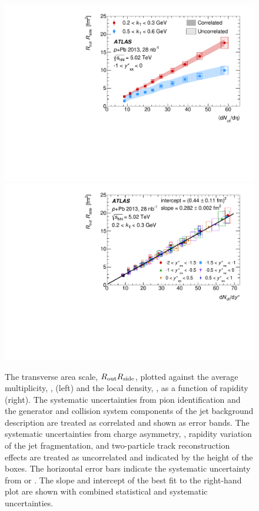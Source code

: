 \FloatBarrier

\begin{figure}[ht]
\centering
\includegraphics[width=0.49\linewidth]{canqosl_detRt_vs_avg_mult.pdf}
\includegraphics[width=0.49\linewidth]{canqosl_detRt_kt1_vs_mult.pdf}
\caption{The transverse area scale, $R_{\mathrm{out}}R_{\mathrm{side}}$, plotted against the average multiplicity, \avgdNdeta, (left) and the local density, \dNdy, as a function of rapidity (right). The systematic uncertainties from pion identification and the generator and collision system components of the jet background description are treated as correlated and shown as error bands. The systematic uncertainties from charge asymmetry, \Reff, rapidity variation of the jet fragmentation, and two-particle track reconstruction effects are treated as uncorrelated and indicated by the height of the boxes. The horizontal error bars indicate the systematic uncertainty from \avgdNdeta or \dNdy. The slope and intercept of the best fit to the right-hand plot are shown with combined statistical and systematic uncertainties.}
\label{fig:results_detRt_mult}
\end{figure}

